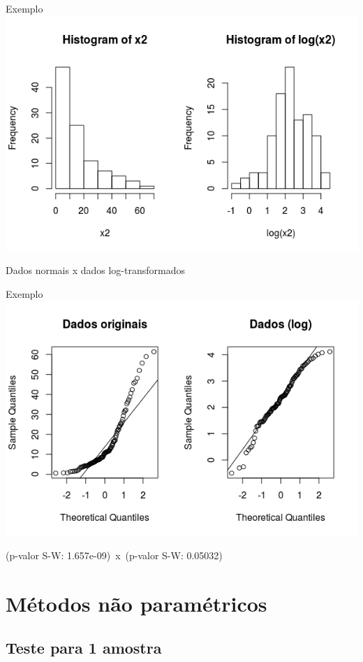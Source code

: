 \documentclass{beamer}
\begin{document}
\begin{frame}{Exemplo}
  \centering
  \includegraphics[width=\textwidth]{Cap37-38/transf-h}

  \footnotesize
Dados normais x dados log-transformados
\end{frame}

\begin{frame}{Exemplo}
  \centering
  \includegraphics[width=\textwidth]{Cap37-38/transf-qq}

  \footnotesize
(p-valor S-W: 1.657e-09)\ x\ (p-valor S-W: 0.05032)
\end{frame}

\section{Métodos não paramétricos}

\subsection[1 amostra]{Teste para 1 amostra}
\end{document}
